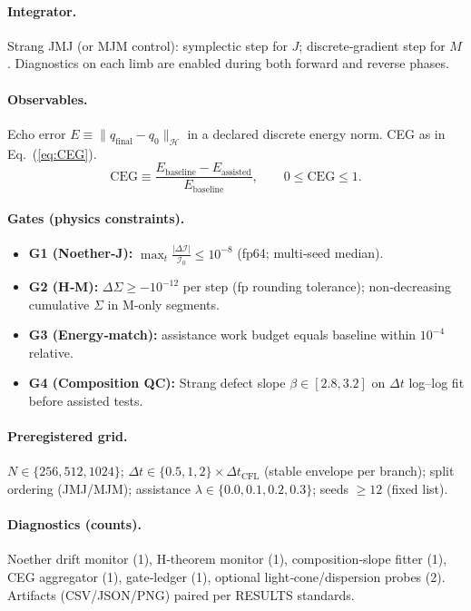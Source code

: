 \documentclass{article}
\begin{document}
\paragraph{Integrator.}
Strang JMJ (or MJM control): symplectic step for $J$; discrete‑gradient step for $M$. Diagnostics on each limb are enabled during both forward and reverse phases.

\paragraph{Observables.}
Echo error $E \equiv \lVert q_{\text{final}}-q_0\rVert_{\mathcal{H}}$ in a declared discrete energy norm. CEG as in Eq.~(\ref{eq:CEG}).
\begin{equation}
\mathrm{CEG} \equiv \frac{E_{\text{baseline}} - E_{\text{assisted}}}{E_{\text{baseline}}}, \qquad 0 \le \mathrm{CEG} \le 1.
\label{eq:CEG}
\end{equation}

\paragraph{Gates (physics constraints).}
\begin{itemize}[leftmargin=1.5em,itemsep=0.25em]
  \item \textbf{G1 (Noether‑J):} $\max_t \frac{|\Delta \mathcal{I}|}{\mathcal{I}_0} \le 10^{-8}$ (fp64; multi‑seed median).
  \item \textbf{G2 (H‑M):} $\Delta \Sigma \ge -10^{-12}$ per step (fp rounding tolerance); non‑decreasing cumulative $\Sigma$ in M‑only segments.
  \item \textbf{G3 (Energy‑match):} assistance work budget equals baseline within $10^{-4}$ relative.
  \item \textbf{G4 (Composition QC):} Strang defect slope $\beta \in [2.8,3.2]$ on $\Delta t$ log–log fit before assisted tests.
\end{itemize}

\paragraph{Preregistered grid.}
$N\in\{256,512,1024\}$; $\Delta t\in\{0.5,1,2\}\times \Delta t_{\text{CFL}}$ (stable envelope per branch); split ordering (JMJ/MJM); assistance $\lambda\in\{0.0,0.1,0.2,0.3\}$; seeds $\ge 12$ (fixed list).

\paragraph{Diagnostics (counts).}
Noether drift monitor (1), H‑theorem monitor (1), composition‑slope fitter (1), CEG aggregator (1), gate‑ledger (1), optional light‑cone/dispersion probes (2). Artifacts (CSV/JSON/PNG) paired per RESULTS standards.
\end{document}
